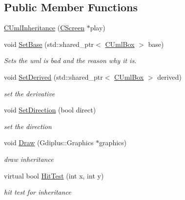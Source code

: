\subsection*{Public Member Functions}
\begin{DoxyCompactItemize}
\item 
\mbox{\hyperlink{class_c_uml_inheritance_a5976881e8fc137ac1b8ffa9d136f27d1}{C\+Uml\+Inheritance}} (\mbox{\hyperlink{class_c_screen}{C\+Screen}} $\ast$play)
\item 
void \mbox{\hyperlink{class_c_uml_inheritance_a29a6e31bd95eb972aa8a0cb2cfe4012c}{Set\+Base}} (std\+::shared\+\_\+ptr$<$ \mbox{\hyperlink{class_c_uml_box}{C\+Uml\+Box}} $>$ base)
\begin{DoxyCompactList}\small\item\em Sets the uml is bad and the reason why it is. \end{DoxyCompactList}\item 
\mbox{\label{class_c_uml_inheritance_a9e8edc6babd8213fd8f606ef34123814}} 
void \mbox{\hyperlink{class_c_uml_inheritance_a9e8edc6babd8213fd8f606ef34123814}{Set\+Derived}} (std\+::shared\+\_\+ptr$<$ \mbox{\hyperlink{class_c_uml_box}{C\+Uml\+Box}} $>$ derived)
\begin{DoxyCompactList}\small\item\em set the derivative \end{DoxyCompactList}\item 
\mbox{\label{class_c_uml_inheritance_a5a07f01e7ee0bec7d53485ca7b0ebe99}} 
void \mbox{\hyperlink{class_c_uml_inheritance_a5a07f01e7ee0bec7d53485ca7b0ebe99}{Set\+Direction}} (bool direct)
\begin{DoxyCompactList}\small\item\em set the direction \end{DoxyCompactList}\item 
void \mbox{\hyperlink{class_c_uml_inheritance_a57c02d5be17880c29a3573ead25ecc36}{Draw}} (Gdiplus\+::\+Graphics $\ast$graphics)
\begin{DoxyCompactList}\small\item\em draw inheritance \end{DoxyCompactList}\item 
virtual bool \mbox{\hyperlink{class_c_uml_inheritance_a2ea7bb7da84ad2e16bdc7a1ba44985a1}{Hit\+Test}} (int x, int y)
\begin{DoxyCompactList}\small\item\em hit test for inheritance \end{DoxyCompactList}\end{DoxyCompactItemize}
